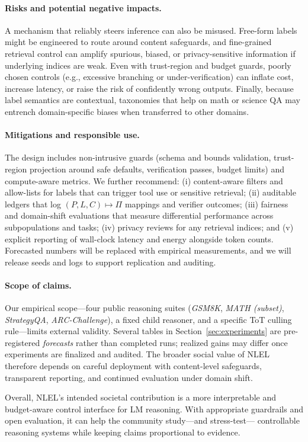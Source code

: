 \documentclass{article}
\theoremstyle{plain}
\theoremstyle{definition}
\theoremstyle{remark}
\begin{document}
\paragraph{Risks and potential negative impacts.}
A mechanism that reliably steers inference can also be misused. Free-form
labels might be engineered to route around content safeguards, and
fine-grained retrieval control can amplify spurious, biased, or
privacy-sensitive information if underlying indices are weak. Even with
trust-region and budget guards, poorly chosen controls (e.g., excessive
branching or under-verification) can inflate cost, increase latency, or
raise the risk of confidently wrong outputs. Finally, because label
semantics are contextual, taxonomies that help on math or science QA may
entrench domain-specific biases when transferred to other domains.

\paragraph{Mitigations and responsible use.}
The design includes non-intrusive guards (schema and bounds validation,
trust-region projection around safe defaults, verification passes, budget
limits) and compute-aware metrics. We further recommend: (i) content-aware
filters and allow-lists for labels that can trigger tool use or sensitive
retrieval; (ii) auditable ledgers that log $(P,L,C)\!\mapsto\!\Pi$ mappings
and verifier outcomes; (iii) fairness and domain-shift evaluations that
measure differential performance across subpopulations and tasks; (iv)
privacy reviews for any retrieval indices; and (v) explicit reporting of
wall-clock latency and energy alongside token counts. Forecasted numbers
will be replaced with empirical measurements, and we will release seeds and
logs to support replication and auditing.

\paragraph{Scope of claims.}
Our empirical scope---four public reasoning suites
(\emph{GSM8K}, \emph{MATH (subset)}, \emph{StrategyQA}, \emph{ARC-Challenge}),
a fixed child reasoner, and a specific ToT culling rule---limits external
validity. Several tables in Section~\ref{sec:experiments} are pre-registered
\emph{forecasts} rather than completed runs; realized gains may differ once
experiments are finalized and audited. The broader social value of NLEL
therefore depends on careful deployment with content-level safeguards,
transparent reporting, and continued evaluation under domain shift.

Overall, NLEL’s intended societal contribution is a more interpretable and
budget-aware control interface for LM reasoning. With appropriate guardrails
and open evaluation, it can help the community study---and stress-test---
controllable reasoning systems while keeping claims proportional to
evidence.





\appendix
\end{document}
